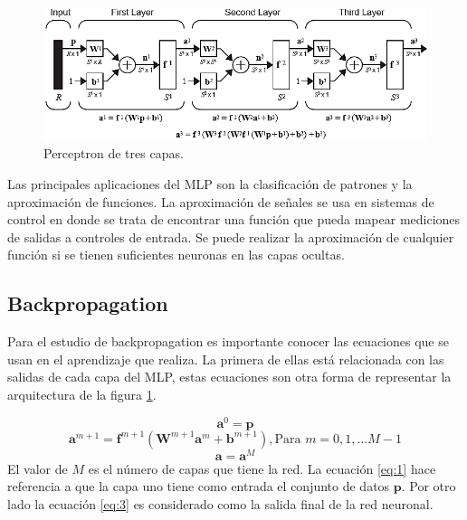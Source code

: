 \documentclass[12pt, titlepage]{article}
\begin{document}
\begin{figure}[H]
    \begin{center}
        \includegraphics[width=16cm]{img/MLP.png}
        \caption{Perceptron de tres capas. \cite{libro1}}
        \label{fig:MLP}
    \end{center}
\end{figure}
Las principales aplicaciones del MLP son la clasificación de patrones y la aproximación de funciones. La aproximación de señales se usa en sistemas de control en donde se trata de encontrar una función que pueda mapear mediciones de salidas a controles de entrada. Se puede realizar la aproximación de cualquier función si se tienen suficientes neuronas en las capas ocultas. 
\subsection{Backpropagation}
Para el estudio de backpropagation es importante conocer las ecuaciones que se usan en el aprendizaje que realiza. La primera de ellas está relacionada con las salidas de cada capa del MLP, estas ecuaciones son otra forma de representar la arquitectura de la figura \ref{fig:MLP}.

\begin{equation} \label{eq:1}
\boldsymbol{a}^0 = \boldsymbol{p}
\end{equation}
\begin{equation} \label{eq:2}
\boldsymbol{a}^{m+1} = \boldsymbol{f}^{m+1}(\boldsymbol{W}^{m+1}\boldsymbol{a}^{m}+\boldsymbol{b}^{m+1}
), \text{Para $m=0, 1, \ldots M-1$}
\end{equation}
\begin{equation} \label{eq:3}
    \boldsymbol{a} = \boldsymbol{a}^{M}
\end{equation}
El valor de $M$ es el número de capas que tiene la red. La ecuación \ref{eq:1} hace referencia a que la capa uno tiene como entrada el conjunto de datos $\boldsymbol{p}$. Por otro lado la ecuación \ref{eq:3} es considerado como la salida final de la red neuronal.
\end{document}
